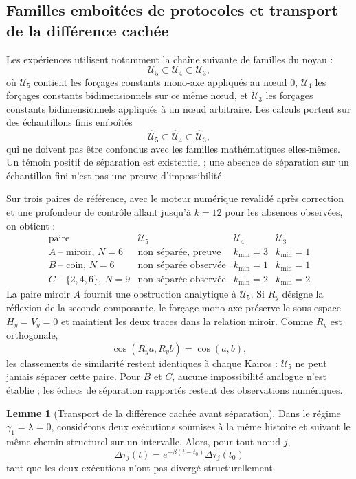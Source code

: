 \documentclass[11pt,a4paper]{article}
\theoremstyle{definition}
\newtheorem{lemma}[definition]{Lemme}
\theoremstyle{remark}
\begin{document}
\subsection{Familles emboîtées de protocoles et transport de la différence cachée}

Les expériences utilisent notamment la chaîne suivante de familles du noyau :
\[
\mathcal U_5\subset\mathcal U_4\subset\mathcal U_3,
\]
où $\mathcal U_5$ contient les forçages constants mono-axe appliqués au nœud $0$, $\mathcal U_4$ les forçages constants bidimensionnels sur ce même nœud, et $\mathcal U_3$ les forçages constants bidimensionnels appliqués à un nœud arbitraire. Les calculs portent sur des échantillons finis emboîtés
\[
\widehat{\mathcal U}_5\subset\widehat{\mathcal U}_4\subset\widehat{\mathcal U}_3,
\]
qui ne doivent pas être confondus avec les familles mathématiques elles-mêmes. Un témoin positif de séparation est existentiel ; une absence de séparation sur un échantillon fini n'est pas une preuve d'impossibilité.

Sur trois paires de référence, avec le moteur numérique revalidé après correction et une profondeur de contrôle allant jusqu'à $k=12$ pour les absences observées, on obtient :
\[
\begin{array}{c|ccc}
\text{paire} & \mathcal U_5 & \mathcal U_4 & \mathcal U_3\\
\hline
A\ \text{-- miroir, }N=6 & \text{non séparée, preuve} & k_{\min}=3 & k_{\min}=1\\
B\ \text{-- coin, }N=6 & \text{non séparée observée} & k_{\min}=1 & k_{\min}=1\\
C\ \text{-- }\{2,4,6\},\ N=9 & \text{non séparée observée} & k_{\min}=2 & k_{\min}=2
\end{array}
\]
La paire miroir $A$ fournit une obstruction analytique à $\mathcal U_5$. Si $R_y$ désigne la réflexion de la seconde composante, le forçage mono-axe préserve le sous-espace $H_y=V_y=0$ et maintient les deux traces dans la relation miroir. Comme $R_y$ est orthogonale,
\[
\cos(R_ya,R_yb)=\cos(a,b),
\]
les classements de similarité restent identiques à chaque Kairos : $\mathcal U_5$ ne peut jamais séparer cette paire. Pour $B$ et $C$, aucune impossibilité analogue n'est établie ; les échecs de séparation rapportés restent des observations numériques.

\begin{lemma}[Transport de la différence cachée avant séparation]
Dans le régime $\gamma_1=\lambda=0$, considérons deux exécutions soumises à la même histoire et suivant le même chemin structurel sur un intervalle. Alors, pour tout nœud $j$,
\[
\Delta\tau_j(t)
= e^{-\beta(t-t_0)}\Delta\tau_j(t_0)
\]
tant que les deux exécutions n'ont pas divergé structurellement.
\end{lemma}
\end{document}
